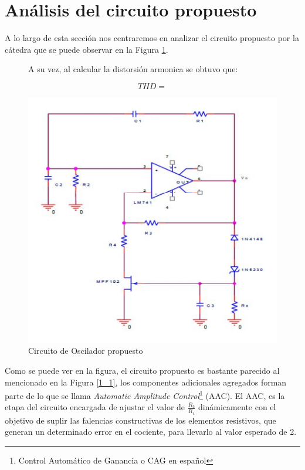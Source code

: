 \section{Análisis del circuito propuesto}

A lo largo de esta sección nos centraremos en analizar el circuito
propuesto por la cátedra que se puede observar en la Figura \ref{1_3}.

\begin{figure}[h]
\begin{centering}
A su vez, al calcular la distorsión armonica se obtuvo que:
\par\end{centering}
\[
THD=
\]
\begin{centering}
\includegraphics[scale=0.7]{../Ex1/Resources/Circuito}
\par\end{centering}
\caption{Circuito de Oscilador propuesto}
\label{1_3}

\end{figure}

Como se puede ver en la figura, el circuito propuesto es bastante
parecido al mencionado en la Figura \ref{1_1}, los componentes adicionales
agregados forman parte de lo que se llama \emph{Automatic Amplitude
Control}\footnote{Control Automático de Ganancia o CAG en español}
(AAC). El AAC, es la etapa del circuito encargada de ajustar el valor
de $\frac{R_{3}}{R_{4}}$ dinámicamente con el objetivo de suplir
las falencias constructivas de los elementos resistivos, que generan
un determinado error en el cociente, para llevarlo al valor esperado
de 2.

